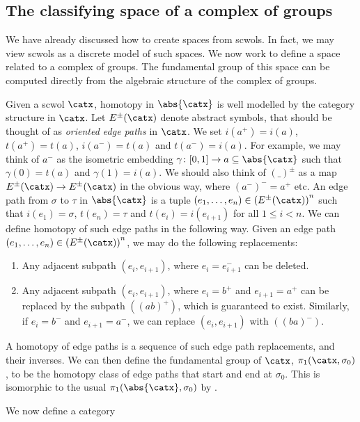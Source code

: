 \subsection{The classifying space of a complex of groups}
We have already discussed how to create spaces from scwols.
In fact, we may view scwols as a discrete model of such spaces.
We now work to define a space related to a complex of groups.
The fundamental group of this space can be computed directly from the algebraic structure of the complex of groups.

Given a scwol $\catx$, homotopy in $\abs{\catx}$ is well modelled by the category structure in $\catx$.
Let  $E^{\pm}(\catx)$ denote abstract symbols, that should be thought of as \emph{oriented edge paths} in $\catx$.
We set $i(a^+) = i(a)$, $t(a^+) = t(a)$, $i(a^-) = t(a)$ and $t(a^-)= i(a)$.
For example, we may think of $a^-$ as the isometric embedding $\gamma \colon [0,1] \to a \subseteq \abs{\catx}$ such that  $\gamma(0) = t(a)$ and $\gamma(1) = i(a)$.
We should also think of $(\_)^\pm$ as a map $E^\pm(\catx) \to E^\pm(\catx)$ in the obvious way, where  $(a^-)^-= a^+$ etc.
An edge path from $\sigma$ to  $\tau$ in $\abs{\catx}$ is a tuple $(e_1, \ldots, e_n) \in \left(E^\pm(\catx)\right)^n$ such that $i(e_1)=\sigma$,  $t(e_n)=\tau$ and  $t(e_i) = i(e_{i+1})$ for all  $1 \leq i < n$.
We can define homotopy of such edge paths in the following way.
Given an edge path $(e_1, \ldots, e_n) \in \left(E^\pm(\catx)\right)^n$, we may do the following replacements:
\begin{enumerate}
	\item Any adjacent subpath $(e_i,e_{i+1})$, where $e_i=e_{i+1}^-$ can be deleted.
	\item Any adjacent subpath $(e_i,e_{i+1})$, where $e_i = b^+$ and  $e_{i+1}=a^+$ can be replaced by the subpath $((ab)^+)$, which is guaranteed to exist.
	      Similarly, if $e_i = b^-$ and  $e_{i+1}=a^-$, we can replace $(e_i,e_{i+1})$ with  $((ba)^-)$.
\end{enumerate}
A homotopy of edge paths is a sequence of such edge path replacements, and their inverses.
We can then define the fundamental group of $\catx$,  $\pi_1(\catx,\sigma_0)$, to be the homotopy class of edge paths that start and end at  $\sigma_0$.
This is isomorphic to the usual $\pi_1(\abs{\catx}, \sigma_0)$ by \cite[Corollary 4.12]{hatcher_algebraic_2001}.

We now define a category
